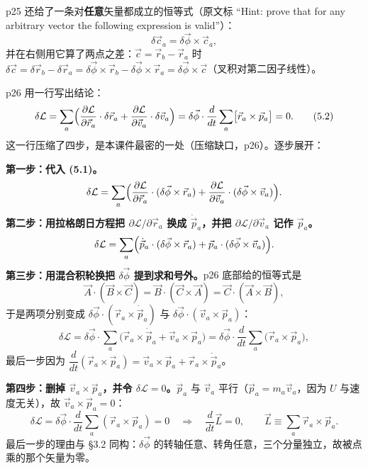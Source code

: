 \documentclass[11pt]{ctexart}
\begin{document}
p25 还给了一条对\textbf{任意}矢量都成立的恒等式（原文标 “Hint: prove that for any arbitrary vector the following expression is valid”）：
\[
\delta\vec c_a=\delta\vec\phi\times\vec c_a ,
\]
并在右侧用它算了两点之差：$\vec c=\vec r_b-\vec r_a$ 时 $\delta\vec c=\delta\vec r_b-\delta\vec r_a=\delta\vec\phi\times\vec r_b-\delta\vec\phi\times\vec r_a=\delta\vec\phi\times\vec c$（叉积对第二因子线性）。



p26 用一行写出结论：
\[
\delta\mathcal{L}=\sum_a\Bigl(\frac{\partial\mathcal{L}}{\partial\vec r_a}\cdot\delta\vec r_a+\frac{\partial\mathcal{L}}{\partial\vec v_a}\cdot\delta\vec v_a\Bigr)
=\delta\vec\phi\cdot\frac{d}{dt}\sum_a\bigl[\vec r_a\times\vec p_a\bigr]=0 . \tag{5.2}
\]
这一行压缩了四步，是本课件最密的一处（压缩缺口，p26）。逐步展开：

\textbf{第一步：代入 (5.1)。}
\[
\delta\mathcal{L}=\sum_a\Bigl(\frac{\partial\mathcal{L}}{\partial\vec r_a}\cdot(\delta\vec\phi\times\vec r_a)+\frac{\partial\mathcal{L}}{\partial\vec v_a}\cdot(\delta\vec\phi\times\vec v_a)\Bigr).
\]
\textbf{第二步：用拉格朗日方程把 $\partial\mathcal{L}/\partial\vec r_a$ 换成 $\dot{\vec p}_a$，并把 $\partial\mathcal{L}/\partial\vec v_a$ 记作 $\vec p_a$。}
\[
\delta\mathcal{L}=\sum_a\Bigl(\dot{\vec p}_a\cdot(\delta\vec\phi\times\vec r_a)+\vec p_a\cdot(\delta\vec\phi\times\vec v_a)\Bigr).
\]
\textbf{第三步：用混合积轮换把 $\delta\vec\phi$ 提到求和号外。}p26 底部给的恒等式是
\[
\vec A\cdot(\vec B\times\vec C)=\vec B\cdot(\vec C\times\vec A)=\vec C\cdot(\vec A\times\vec B),
\]
于是两项分别变成 $\delta\vec\phi\cdot(\vec r_a\times\dot{\vec p}_a)$ 与 $\delta\vec\phi\cdot(\vec v_a\times\vec p_a)$：
\[
\delta\mathcal{L}=\delta\vec\phi\cdot\sum_a\bigl(\vec r_a\times\dot{\vec p}_a+\vec v_a\times\vec p_a\bigr)
=\delta\vec\phi\cdot\frac{d}{dt}\sum_a\bigl(\vec r_a\times\vec p_a\bigr),
\]
最后一步因为 $\dfrac{d}{dt}(\vec r_a\times\vec p_a)=\vec v_a\times\vec p_a+\vec r_a\times\dot{\vec p}_a$。

\textbf{第四步：删掉 $\vec v_a\times\vec p_a$，并令 $\delta\mathcal{L}=0$。}$\vec p_a$ 与 $\vec v_a$ 平行（$\vec p_a=m_a\vec v_a$，因为 $U$ 与速度无关），故 $\vec v_a\times\vec p_a=0$：
\[
\delta\mathcal{L}=\delta\vec\phi\cdot\frac{d}{dt}\sum_a(\vec r_a\times\vec p_a)=0
\quad\Longrightarrow\quad
\frac{d}{dt}\vec L=0,\qquad \vec L\equiv\sum_a\vec r_a\times\vec p_a . \tag{5.3}
\]
最后一步的理由与 §3.2 同构：$\delta\vec\phi$ 的转轴任意、转角任意，三个分量独立，故被点乘的那个矢量为零。
\end{document}

